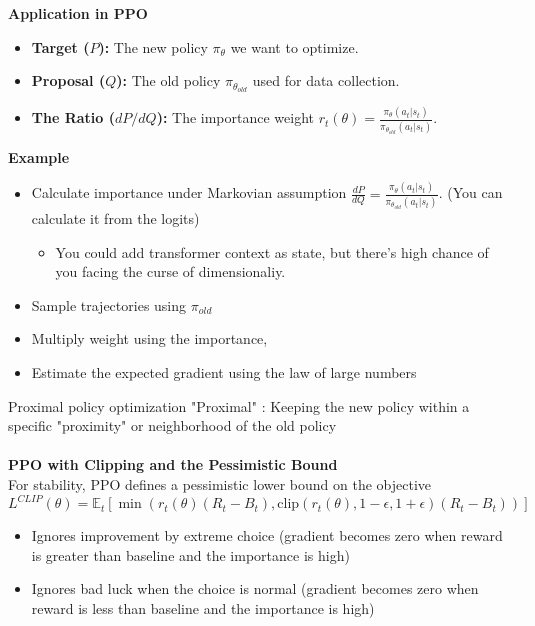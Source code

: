 \documentclass[]{beamer}
\begin{document}
\begin{frame}
    \textbf{Application in PPO}
    \begin{itemize}
        \item \textbf{Target ($P$):} The new policy $\pi_{\theta}$ we want to optimize.
        \item \textbf{Proposal ($Q$):} The old policy $\pi_{\theta_{old}}$ used for data collection.
        \item \textbf{The Ratio ($dP/dQ$):} The importance weight $r_t(\theta) = \frac{\pi_{\theta}(a_t|s_t)}{\pi_{\theta_{old}}(a_t|s_t)}$.
    \end{itemize}

    \textbf{Example}
    \begin{itemize}
        \item Calculate importance under Markovian assumption $\frac{dP}{dQ} = \frac{\pi_{\theta}(a_t|s_t)}{\pi_{\theta_{old}}(a_t|s_t)}$. (You can calculate it from the logits)
        \begin{itemize}
            \item You could add transformer context as state, but there's high chance of you facing the curse of dimensionaliy.
        \end{itemize}
        \item Sample trajectories using $\pi_{old}$
        \item Multiply weight using the importance, 
        \item Estimate the expected gradient using the law of large numbers  
    \end{itemize}
\end{frame}

\begin{frame}{Proximal policy optimization}
    "Proximal" : Keeping the new policy within a specific "proximity" or neighborhood of the old policy
\\~\\
    \textbf{PPO with Clipping and the Pessimistic Bound}\\
    For stability, PPO defines a pessimistic lower bound on the objective
    $$ L^{CLIP}(\theta) = \mathbb{E}_t \left[ \min \left( r_t(\theta) (R_t - B_t), \text{clip}(r_t(\theta), 1-\epsilon, 1+\epsilon) (R_t-B_t) \right) \right] $$
    \begin{itemize}
        \item Ignores improvement by extreme choice (gradient becomes zero when reward is greater than baseline and the importance is high) 
        \item Ignores bad luck when the choice is normal (gradient becomes zero when reward is less than baseline and the importance is high) 
    \end{itemize}
\end{frame}
\end{document}
